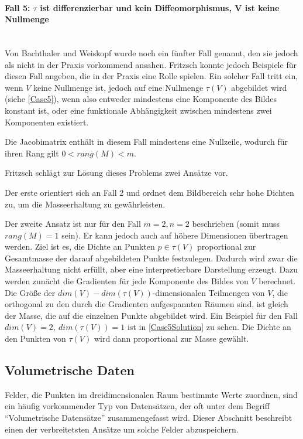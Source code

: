 \documentclass[a4paper,fontsize=12pt,toc=bib,halfparskip,ngerman]{scrartcl}
\begin{document}
\paragraph{Fall 5: $\tau$ ist differenzierbar und kein Diffeomorphismus, V ist keine Nullmenge}\mbox{}\\
Von Bachthaler und Weiskopf wurde noch ein f\"unfter Fall genannt, den sie jedoch als nicht in der Praxis vorkommend ansahen. Fritzsch konnte jedoch Beispiele f\"ur diesen Fall angeben\cite[S.~23~f.]{fritzsch2016continuousScatterplot}, die in der Praxis eine Rolle spielen. Ein solcher Fall tritt ein, wenn $V$ keine Nullmenge ist, jedoch auf eine Nullmenge $\tau(V)$ abgebildet wird (siehe \cref{Case5}), wenn also entweder mindestens eine Komponente des Bildes konstant ist, oder eine funktionale Abh\"angigkeit zwischen mindestens zwei Komponenten existiert. 

Die Jacobimatrix enth\"alt in diesem Fall mindestens eine Nullzeile, wodurch f\"ur ihren Rang gilt $0 < rang(M) < m$. 

Fritzsch schl\"agt zur L\"osung dieses Problems zwei Ans\"atze vor. 

Der erste orientiert sich an Fall 2 und ordnet dem Bildbereich sehr hohe Dichten zu, um die Masseerhaltung zu gew\"ahrleisten. 

Der zweite Ansatz ist nur f\"ur den Fall $m=2, n=2$ beschrieben (somit muss $rang(M) = 1$ sein). Er kann jedoch auch auf h\"ohere Dimensionen \"ubertragen werden. Ziel ist es, die Dichte an Punkten $p\in\tau(V)$ proportional zur Gesamtmasse der darauf abgebildeten Punkte festzulegen. Dadurch wird zwar die Masseerhaltung nicht erf\"ullt, aber eine interpretierbare Darstellung erzeugt. Dazu werden zun\"acht die Gradienten f\"ur jede Komponente des Bildes von $V$ berechnet. Die Gr\"o{\ss}e der $dim(V) - dim(\tau(V))$-dimensionalen Teilmengen von $V$, die orthogonal zu den durch die Gradienten aufgespannten R\"aumen sind, ist gleich der Masse, die auf die einzelnen Punkte abgebildet wird. Ein Beispiel f\"ur den Fall $dim(V) = 2,~dim(\tau(V)) = 1$ ist in \cref{Case5Solution} zu sehen. Die Dichte an den Punkten von $\tau(V)$ wird dann proportional zur Masse gew\"ahlt.

\subsection{Volumetrische Daten}
Felder, die Punkten im dreidimensionalen Raum bestimmte Werte zuordnen, sind ein h\"aufig vorkommender Typ von Datens\"atzen, der oft unter dem Begriff ``Volumetrische Datens\"atze'' zusammengefasst wird. Dieser Abschnitt beschreibt einen der verbreitetsten Ans\"atze um solche Felder abzuspeichern.  
\end{document}
